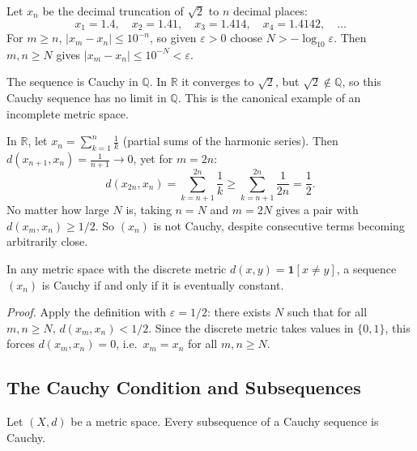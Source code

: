 \begin{example}
Let $x_n$ be the decimal truncation of $\sqrt{2}$ to $n$ decimal places:
\[
  x_1 = 1.4,\quad
  x_2 = 1.41,\quad
  x_3 = 1.414,\quad
  x_4 = 1.4142,\quad \ldots
\]
For $m \ge n$, $|x_m - x_n| \le 10^{-n}$, so given $\varepsilon > 0$
choose $N > -\log_{10}\varepsilon$.
Then $m,n \ge N$ gives $|x_m - x_n| \le 10^{-N} < \varepsilon$.

The sequence is Cauchy in $\mathbb{Q}$.
In $\mathbb{R}$ it converges to $\sqrt{2}$, but $\sqrt{2} \notin \mathbb{Q}$,
so this Cauchy sequence has no limit in $\mathbb{Q}$.
This is the canonical example of an incomplete metric space.
\end{example}

\begin{example}
In $\mathbb{R}$, let $x_n = \sum_{k=1}^{n} \frac{1}{k}$ (partial sums of the
harmonic series).
Then $d(x_{n+1}, x_n) = \frac{1}{n+1} \to 0$, yet for $m = 2n$:
\[
  d(x_{2n}, x_n)
  = \sum_{k=n+1}^{2n} \frac{1}{k}
  \ge \sum_{k=n+1}^{2n} \frac{1}{2n}
  = \frac{1}{2}.
\]
No matter how large $N$ is, taking $n = N$ and $m = 2N$ gives a pair
with $d(x_m, x_n) \ge 1/2$.
So $(x_n)$ is not Cauchy, despite consecutive terms becoming arbitrarily
close.
\end{example}

\begin{example}
In any metric space with the discrete metric
$d(x,y) = \mathbf{1}[x \neq y]$,
a sequence $(x_n)$ is Cauchy if and only if it is eventually constant.

\emph{Proof.} Apply the definition with $\varepsilon = 1/2$: there
exists $N$ such that for all $m,n \ge N$, $d(x_m, x_n) < 1/2$.
Since the discrete metric takes values in $\{0,1\}$, this forces
$d(x_m,x_n) = 0$, i.e.\ $x_m = x_n$ for all $m,n \ge N$.
\end{example}

\subsection{The Cauchy Condition and Subsequences}
\label{sec:cauchy-subsequences}

\begin{proposition}
\label{prop:cauchy-subsequence-cauchy}
Let $(X,d)$ be a metric space.
Every subsequence of a Cauchy sequence is Cauchy.
\end{proposition}

